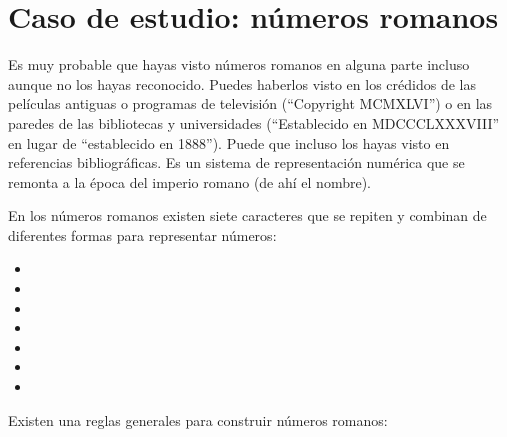 \section{Caso de estudio: números romanos}

Es muy probable que hayas visto números romanos en alguna parte incluso aunque no los hayas reconocido. Puedes haberlos visto en los crédidos de las películas antiguas o programas de televisión (``Copyright MCMXLVI'') o en las paredes de las bibliotecas y universidades (``Establecido en MDCCCLXXXVIII'' en lugar de ``establecido en 1888''). Puede que incluso los hayas visto en referencias bibliográficas. Es un sistema de representación numérica que se remonta a la época del imperio romano (de ahí el nombre).

En los números romanos existen siete caracteres que se repiten y combinan de diferentes formas para representar números:

\begin{itemize}
\item {}
\item {}
\item {}
\item {}
\item {}
\item {}
\item {}
\end{itemize}

Existen una reglas generales para construir números romanos:

